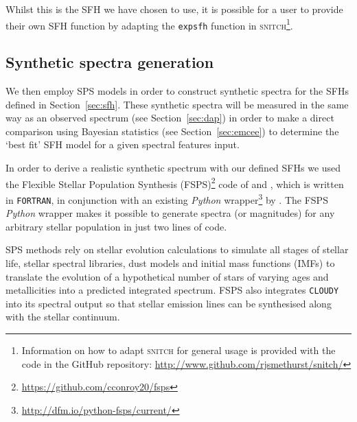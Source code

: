 \documentclass[useAMS,usenatbib]{mn2e}
\begin{document}
Whilst this is the SFH we have chosen to use, it is possible for a user to provide their own SFH function by adapting the \texttt{expsfh} function in \textsc{snitch}\footnote{Information on how to adapt \textsc{snitch} for general usage is provided with the code in the GitHub repository: \url{http://www.github.com/rjsmethurst/snitch/}}.


\subsection{Synthetic spectra generation}\label{sec:fsps}

We then employ SPS models in order to construct synthetic spectra for the SFHs defined in Section~\ref{sec:sfh}. These synthetic spectra will be measured in the same way as an observed spectrum (see Section~\ref{sec:dap}) in order to make a direct comparison using Bayesian statistics (see Section~\ref{sec:emcee}) to determine the `best fit' SFH model for a given spectral features input. 

In order to derive a realistic synthetic spectrum with our defined SFHs we used the Flexible Stellar Population Synthesis (FSPS)\footnote{\url{https://github.com/cconroy20/fsps}} code of \cite{conroy09} and \citet{conroy10}, which is written in \texttt{FORTRAN}, in conjunction with an existing \emph{Python} wrapper\footnote{\url{http://dfm.io/python-fsps/current/}} by \cite{python_fsps}. The FSPS \emph{Python} wrapper makes it possible to generate spectra (or magnitudes) for any arbitrary stellar population in just two lines of code.  

SPS methods rely on stellar evolution calculations to simulate all stages of stellar life, stellar spectral libraries, dust models and initial mass functions (IMFs) to translate the evolution of a hypothetical number of stars of varying ages and metallicities into a predicted integrated spectrum. FSPS also integrates \texttt{CLOUDY} \citep{ferland13} into its spectral output so that stellar emission lines can be synthesised along with the stellar continuum. 


\end{document}
